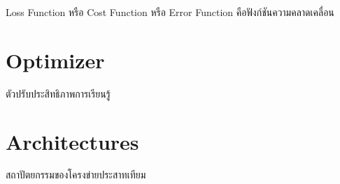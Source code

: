 Loss Function หรือ Cost Function หรือ Error Function คือฟังก์ชันความคลาดเคลื่อน

\section{Optimizer}

ตัวปรับประสิทธิภาพการเรียนรู้

\section{Architectures}

สถาปัตยกรรมของโครงข่ายประสาทเทียม

